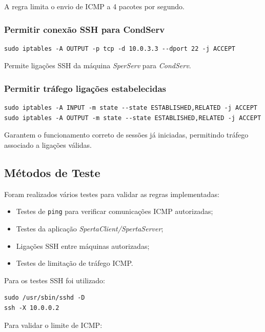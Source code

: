 \documentclass{article}
\begin{document}
A regra limita o envio de ICMP a 4 pacotes por segundo.

\subsubsection{Permitir conexão SSH para CondServ}

\begin{lstlisting}
sudo iptables -A OUTPUT -p tcp -d 10.0.3.3 --dport 22 -j ACCEPT
\end{lstlisting}

Permite ligações SSH da máquina \textit{SperServ} para \textit{CondServ}.

\subsubsection{Permitir tráfego ligações estabelecidas}

\begin{lstlisting}
sudo iptables -A INPUT -m state --state ESTABLISHED,RELATED -j ACCEPT
sudo iptables -A OUTPUT -m state --state ESTABLISHED,RELATED -j ACCEPT
\end{lstlisting}

Garantem o funcionamento correto de sessões já iniciadas, permitindo tráfego associado a ligações válidas.

\subsection{Métodos de Teste}

Foram realizados vários testes para validar as regras implementadas:

\begin{itemize}
    \item Testes de \texttt{ping} para verificar comunicações ICMP autorizadas;
    \item Testes da aplicação \textit{SpertaClient/SpertaServer};
    \item Ligações SSH entre máquinas autorizadas;
    \item Testes de limitação de tráfego ICMP.
\end{itemize}

Para os testes SSH foi utilizado:

\begin{lstlisting}
sudo /usr/sbin/sshd -D
ssh -X 10.0.0.2
\end{lstlisting}

Para validar o limite de ICMP:
\end{document}
